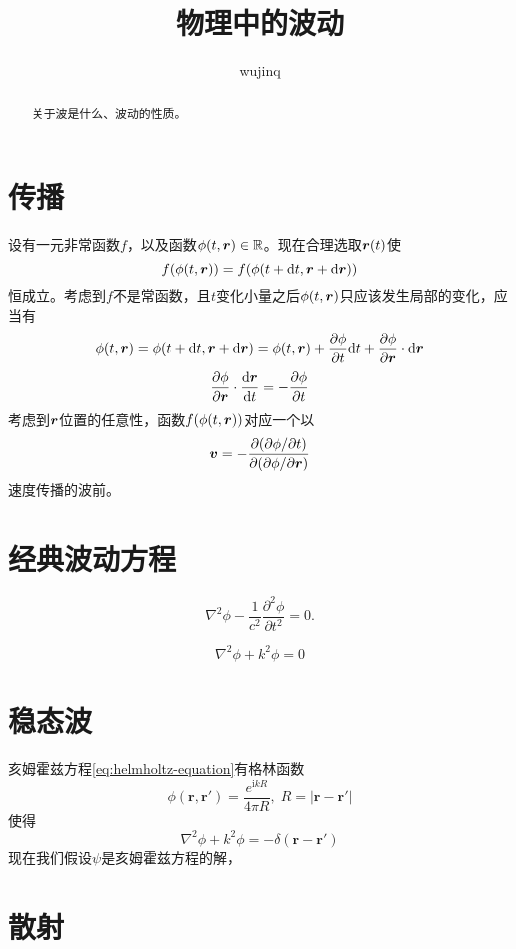 \documentclass[UTF8]{ctexart}
\title{物理中的波动}
\author{wujinq}
\newcommand*{\reals}{\mathbb{R}}
\begin{document}
\maketitle

\begin{abstract}
    关于波是什么、波动的性质。
\end{abstract}

\section{传播}
设有一元非常函数$f$，以及函数$\phi(t, \vb*{r}) \in \reals$。现在合理选取$\vb*{r}(t)$使
\[
    f(\phi(t, \vb*{r})) = f(\phi(t + \dd t, \vb*{r} + \dd \vb*{r}))
\]
恒成立。考虑到$f$不是常函数，且$t$变化小量之后$\phi(t, \vb*{r})$只应该发生局部的变化，应当有
\[
    \phi(t, \vb*{r}) = \phi(t + \dd t, \vb*{r} + \dd \vb*{r}) = 
    \phi(t, \vb*{r}) + \pdv{\phi}{t} \dd t + \pdv{\phi}{\vb*{r}} \cdot \dd \vb*{r}
\]
\[
    \pdv{\phi}{\vb*{r}} \cdot \dv{\vb*{r}}{t} = - \pdv{\phi}{t}
\]
考虑到$\vb*{r}$位置的任意性，函数$f(\phi(t, \vb*{r}))$对应一个以
\[
    \vb*{v} = - \pdv{(\partial \phi / \partial t)}{(\partial \phi / \partial \vb*{r})}
\]
速度传播的波前。

\section{经典波动方程}
\begin{equation}
    \nabla^2 \phi - \frac{1}{c^2} \frac{\partial^2 \phi}{\partial t^2} = 0.
    \label{eq:classical-wave-equation}
\end{equation}

\begin{equation}
    \nabla^2 \phi + k^2 \phi = 0
    \label{eq:helmholtz-equation}
\end{equation}

\section{稳态波}

亥姆霍兹方程\eqref{eq:helmholtz-equation}有格林函数
\begin{equation}
    \phi (\boldsymbol{r}, \boldsymbol{r}') = \frac{e^{\mathrm{i}kR}}{4\pi R}, \; R = |\boldsymbol{r} - \boldsymbol{r}'|
\end{equation}
使得
\[
    \nabla^2 \phi + k^2 \phi = - \delta(\boldsymbol{r} - \boldsymbol{r}')
\]
现在我们假设$\psi$是亥姆霍兹方程的解，

\section{散射}
\end{document}
